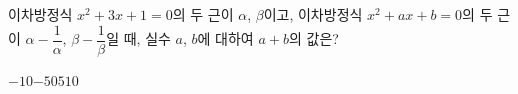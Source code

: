 이차방정식 $x^2+3x+1=0$의 두 근이 $\alpha$, $\beta$이고, 이차방정식 $x^2+ax+b=0$의 두 근이 $\alpha-\dfrac{1}{\alpha}$, $\beta-\dfrac{1}{\beta}$일 때, 실수 $a$, $b$에 대하여 $a+b$의 값은?
\begin{choices32}{$-10$}{$-5$}{$0$}{$5$}{$10$}\end{choices32}
